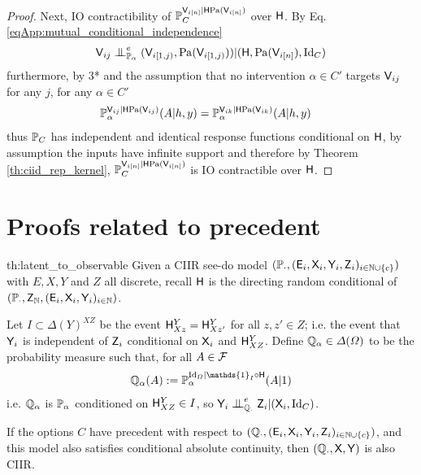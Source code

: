\begin{proof}
Next, IO contractibility of $\mathbb{P}_C^{\mathsf{V}_{i[n]}|\mathsf{H}\mathrm{Pa}(\mathsf{V}_{i [n]})}$ over $\mathsf{H}$. By Eq. \eqref{eqApp:mutual_conditional_independence}
\begin{align}
    \RV{V}_{ij}\CI^e_{\prob{P}_{\alpha}} (\RV{V}_{i [1,j)},\mathrm{Pa}(\RV{V}_{i [1,j)}) )|(\RV{H},\mathrm{Pa}(\RV{V}_{i[n]}),\text{Id}_C)
\end{align}
furthermore, by 3* and the assumption that no intervention $\alpha\in C'$ targets $\mathsf{V}_{ij}$ for any $j$, for any $\alpha\in C'$
\begin{align}
    \mathbb{P}_{\alpha}^{\mathsf{V}_{ij}|\mathsf{H}\mathrm{Pa}(\mathsf{V}_{ij})}(A|h,y) &= \mathbb{P}_{\alpha}^{\mathsf{V}_{ik}|\mathsf{H}\mathrm{Pa}(\mathsf{V}_{ik})}(A|h,y) 
\end{align}
thus $\mathbb{P}_C$ has independent and identical response functions conditional on $\mathsf{H}$, by assumption the inputs have infinite support and therefore by Theorem \ref{th:ciid_rep_kernel}, $\mathbb{P}_C^{\mathsf{V}_{i[n]}|\mathsf{H}\mathrm{Pa}(\mathsf{V}_{i [n]})}$ is IO contractible over $\mathsf{H}$.
\end{proof}

\section{Proofs related to precedent}\label{sec:proof_precedent}


\begin{reptheorem}{th:latent_to_observable}
Given a CIIR see-do model $(\mathbb{P}_\cdot,(\mathsf{E}_i,\mathsf{X}_i,\mathsf{Y}_i,\mathsf{Z}_i)_{i\in\mathbb{N}\cup\{c\}})$ with $E,X,Y$ and $Z$ all discrete, recall $\mathsf{H}$ is the directing random conditional of $(\mathbb{P}_\cdot,\mathsf{Z}_{\mathbb{N}},(\mathsf{E}_i,\mathsf{X}_i,\mathsf{Y}_i)_{i\in \mathbb{N}})$.

Let $I\subset \Delta(Y)^{XZ}$ be the event $\mathsf{H}^Y_{Xz}=\mathsf{H}^Y_{Xz'}$ for all $z,z'\in Z$; i.e. the event that $\mathsf{Y}_i$ is independent of $\mathsf{Z}_i$ conditional on $\mathsf{X}_i$ and $\mathsf{H}^Y_{XZ}$. Define $\mathbb{Q}_\alpha\in \Delta(\Omega)$ to be the probability measure such that, for all $A\in \mathcal{F}$
\begin{align}
\prob{Q}_\alpha(A) := \prob{P}_\alpha^{\mathrm{Id}_\Omega|\mathds{1}_I\circ \RV{H}}(A|1)
\end{align}
i.e. $\mathbb{Q}_\alpha$ is $\mathbb{P}_\alpha$ conditioned on $\mathsf{H}^Y_{XZ}\in I$, so $\RV{Y}_i\CI^e_{\prob{Q}_\cdot} \RV{Z}_i|(\RV{X}_i,\mathrm{Id}_C)$.

If the options $C$ have precedent with respect to $(\mathbb{Q}_\cdot,(\mathsf{E}_i,\mathsf{X}_i,\mathsf{Y}_i,\mathsf{Z}_i)_{i\in\mathbb{N}\cup\{c\}})$, and this model also satisfies conditional absolute continuity, then $(\mathbb{Q}_\cdot,\mathsf{X},\mathsf{Y})$ is also CIIR.
\end{reptheorem}

